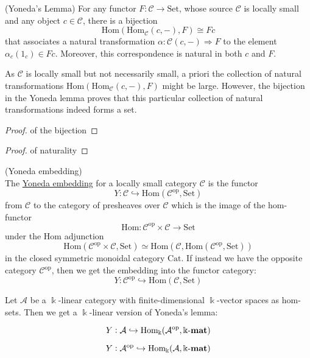 \begin{lemma}{(Yoneda's Lemma)}
For any functor $F : \mathcal{C} \rightarrow \mathrm{Set}$, whose source $\mathcal{C}$ is locally small and any
object $c \in \mathcal{C}$, there is a bijection
\[
\mathrm{Hom}(\mathrm{Hom}_{\mathcal{C}}(c,-), F) \cong Fc
\]
that associates a natural transformation $\alpha : \mathcal{C}(c,-) \Rightarrow F$ to the element $\alpha_{c}(1_{c}) \in Fc$.
Moreover, this correspondence is natural in both $c$ and $F$.
\end{lemma}
As $\mathcal{C}$ is locally small but not necessarily small, a priori the collection of natural transformations
$\mathrm{Hom}(\mathrm{Hom}_{\mathcal{C}}(c,-),F)$ might be large. However, the bijection in the Yoneda lemma proves that this particular
collection of natural transformations indeed forms a set.
\begin{proof}{of the bijection}

\end{proof}
\begin{proof}{of naturality}

\end{proof}

\begin{definition}{(Yoneda embedding)}\label{def:yoneda_embedding}\\
The \ul{Yoneda embedding} for a locally small category $\mathcal{C}$ is the functor
\[
Y : \mathcal{C} \hookrightarrow \mathrm{Hom}(\mathcal{C}^{\text{op}}, \mathrm{Set})
\]
from $\mathcal{C}$ to the category of presheaves over $\mathcal{C}$ which is the image of the hom-functor
\[
\mathrm{Hom} : \mathcal{C}^{\text{op}}\times\mathcal{C} \rightarrow \mathrm{Set}
\]
under the $\mathrm{Hom}$ adjunction
\[
\mathrm{Hom}(\mathcal{C}^{\text{op}}\times\mathcal{C}, \mathrm{Set}) \simeq
\mathrm{Hom}(\mathcal{C},\mathrm{Hom}(\mathcal{C}^{\text{op}}, \mathrm{Set}))
\]
in the closed symmetric monoidal category $\mathrm{Cat}$.
If instead we have the opposite category $\mathcal{C}^{\text{op}}$, then we get the embedding into the functor category:
\[
Y : \mathcal{C}^{\text{op}} \hookrightarrow \mathrm{Hom}(\mathcal{C},\mathrm{Set})
\]
\end{definition}

\begin{remark}
Let $\mathcal{A}$ be a $\Bbbk$-linear category with finite-dimensional $\Bbbk$-vector spaces as hom-sets. Then we get
a $\Bbbk$-linear version of Yoneda's lemma:

\[
Y : \mathcal{A} \hookrightarrow \mathrm{Hom_{\Bbbk}}(\mathcal{A^{\text{op}}},\Bbbk\textnormal{-}\mathbf{mat})
\]

\[
Y : \mathcal{A}^{\text{op}} \hookrightarrow \mathrm{Hom_{\Bbbk}}(\mathcal{A},\Bbbk\textnormal{-}\mathbf{mat})
\]

\end{remark}

